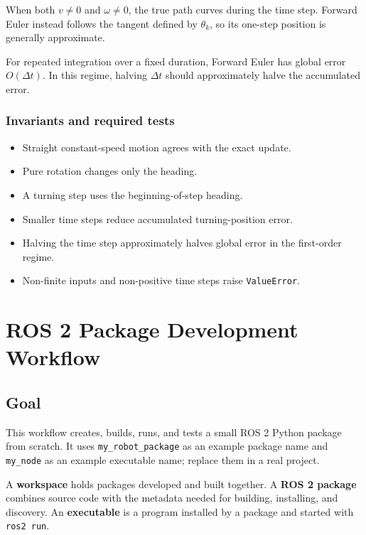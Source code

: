 \documentclass[
  australian,
  12pt,
  letterpaper,
  DIV=11,
  numbers=noendperiod,
  twoside]{scrreprt}
\providecommand{\tightlist}{%
  \setlength{\itemsep}{0pt}\setlength{\parskip}{0pt}}
\begin{document}
When both \(v\neq0\) and \(\omega\neq0\), the true path curves during
the time step. Forward Euler instead follows the tangent defined by
\(\theta_k\), so its one-step position is generally approximate.

For repeated integration over a fixed duration, Forward Euler has global
error \(O(\Delta t)\). In this regime, halving \(\Delta t\) should
approximately halve the accumulated error.

\subsection{Invariants and required
tests}\label{invariants-and-required-tests-2}

\begin{itemize}
\tightlist
\item
  Straight constant-speed motion agrees with the exact update.
\item
  Pure rotation changes only the heading.
\item
  A turning step uses the beginning-of-step heading.
\item
  Smaller time steps reduce accumulated turning-position error.
\item
  Halving the time step approximately halves global error in the
  first-order regime.
\item
  Non-finite inputs and non-positive time steps raise
  \texttt{ValueError}.
\end{itemize}

\chapter{ROS 2 Package Development
Workflow}\label{sec-ros2-package-development-workflow}

\section*{Goal}\label{goal}


This workflow creates, builds, runs, and tests a small ROS 2 Python
package from scratch. It uses \texttt{my\_robot\_package} as an example
package name and \texttt{my\_node} as an example executable name;
replace them in a real project.

A \textbf{workspace} holds packages developed and built together. A
\textbf{ROS 2 package} combines source code with the metadata needed for
building, installing, and discovery. An \textbf{executable} is a program
installed by a package and started with \texttt{ros2\ run}.
\end{document}
